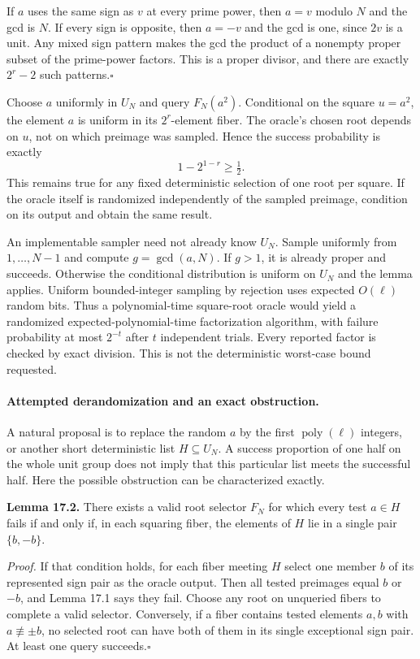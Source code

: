 \documentclass[11pt]{article}
\begin{document}
If $a$ uses the same sign as $v$ at every prime power, then $a=v$
modulo $N$ and the gcd is $N$. If every sign is opposite, then $a=-v$
and the gcd is one, since $2v$ is a unit. Any mixed sign pattern makes
the gcd the product of a nonempty proper subset of the prime-power
factors. This is a proper divisor, and there are exactly $2^r-2$ such
patterns.\hfill$\square$

Choose $a$ uniformly in $U_N$ and query $F_N(a^2)$. Conditional on the
square $u=a^2$, the element $a$ is uniform in its $2^r$-element fiber.
The oracle's chosen root depends on $u$, not on which preimage was
sampled. Hence the success probability is exactly
\begin{equation}\label{ra:17:probability}
 1-2^{1-r}\ge\tfrac12.
\end{equation}
This remains true for any fixed deterministic selection of one root
per square. If the oracle itself is randomized independently of the
sampled preimage, condition on its output and obtain the same result.

An implementable sampler need not already know $U_N$. Sample uniformly
from $1,\ldots,N-1$ and compute $g=\gcd(a,N)$. If $g>1$, it is already
proper and succeeds. Otherwise the conditional distribution is uniform
on $U_N$ and the lemma applies. Uniform bounded-integer sampling by
rejection uses expected $O(\ell)$ random bits. Thus a polynomial-time
square-root oracle would yield a randomized expected-polynomial-time
factorization algorithm, with failure probability at most $2^{-t}$
after $t$ independent trials. Every reported factor is checked by exact
division. This is not the deterministic worst-case bound requested.

\paragraph{Attempted derandomization and an exact obstruction.}
A natural proposal is to replace the random $a$ by the first
$\operatorname{poly}(\ell)$ integers, or another short deterministic
list $H\subseteq U_N$. A success proportion of one half on the whole
unit group does not imply that this particular list meets the successful
half. Here the possible obstruction can be characterized exactly.

\textbf{Lemma 17.2.} There exists a valid root selector $F_N$ for which
every test $a\in H$ fails if and only if, in each squaring fiber, the
elements of $H$ lie in a single pair $\{b,-b\}$.

\textit{Proof.}
If that condition holds, for each fiber meeting $H$ select one member
$b$ of its represented sign pair as the oracle output. Then all tested
preimages equal $b$ or $-b$, and Lemma 17.1 says they fail. Choose any
root on unqueried fibers to complete a valid selector. Conversely, if
a fiber contains tested elements $a,b$ with $a\not\equiv\pm b$, no
selected root can have both of them in its single exceptional sign pair.
At least one query succeeds.\hfill$\square$
\end{document}
